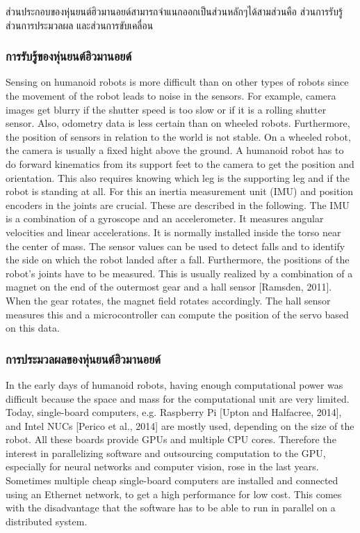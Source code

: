 ส่วนประกอบของหุ่นยนต์ฮิวมานอยด์สามารถจำแนกออกเป็นส่วนหลักๆได้สามส่วนคือ 
ส่วนการรับรู้ ส่วนการประมวลผล และส่วนการขับเคลื่อน

\subsubsection*{การรับรู้ของหุ่นยนต์ฮิวมานอยด์}
Sensing on humanoid robots is more difficult than on other types of robots since the
movement of the robot leads to noise in the sensors.  For example, camera images
get blurry if the shutter speed is too slow or if it is a rolling shutter sensor.  Also,
odometry  data  is  less  certain  than  on  wheeled  robots.   Furthermore,  the  position
of sensors in relation to the world is not stable.  On a wheeled robot, the camera
is  usually  a  fixed  hight  above  the  ground.   A  humanoid  robot  has  to  do  forward
kinematics from its support feet to the camera to get the position and orientation.
This also requires knowing which leg is the supporting leg and if the robot is standing
at all. For this an inertia measurement unit (IMU) and position encoders in the joints
are crucial.  These are described in the following.
The  IMU  is  a  combination  of  a  gyroscope  and  an  accelerometer.   It  measures
angular velocities and linear accelerations.  It is normally installed inside the torso
near the center of mass.  The sensor values can be used to detect falls and to identify
the side on which the robot landed after a fall.
Furthermore,  the  positions  of  the  robot’s  joints  have  to  be  measured.   This  is
usually  realized  by  a  combination  of  a  magnet  on  the  end  of  the  outermost  gear
and a hall sensor [Ramsden, 2011].  When the gear rotates, the magnet field rotates
accordingly.  The hall sensor measures this and a microcontroller can compute the
position of the servo based on this data.

\subsubsection*{การประมวลผลของหุ่นยนต์ฮิวมานอยด์}
In  the  early  days  of  humanoid  robots,  having  enough  computational  power  was
difficult because the  space and  mass for  the computational  unit are  very  limited.
Today, single-board computers, e.g.  Raspberry Pi [Upton and Halfacree, 2014], and
Intel NUCs [Perico et al., 2014] are mostly used, depending on the size of the robot.
All these boards provide GPUs and multiple CPU cores.  Therefore the interest in
parallelizing software and outsourcing computation to the GPU, especially for neural
networks  and  computer  vision,  rose  in  the  last  years.   Sometimes  multiple  cheap
single-board computers are installed and connected using an Ethernet network, to
get  a  high  performance  for  low  cost.   This  comes  with  the  disadvantage  that  the
software has to be able to run in parallel on a distributed system.

